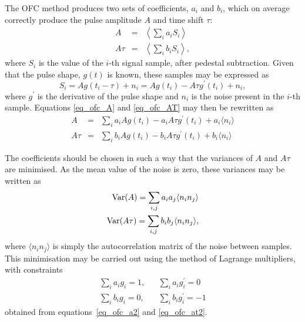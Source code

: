 The OFC method produces two sets of coefficients, $a_i$ and $b_i$, which on average correctly produce the pulse amplitude $A$ and time shift $\tau$:
\begin{eqnarray}
A & = & \left \langle \sum_i a_i S_i  \right \rangle \label{eq_ofc_A} \\
A \tau & = & \left \langle \sum_i b_i S_i \right \rangle , \label{eq_ofc_AT}
\end{eqnarray}
where $S_i$ is the value of the $i$-th signal sample, after pedestal subtraction. Given that the pulse shape, $g(t)$  is known, these samples may be expressed as
\begin{equation}
\label{eq_OFC_taylor}
 S_i = A g(t_i - \tau) + n_i = A g(t_i) - A \tau g^\prime(t_i) +n_i, 
\end{equation}
where $g^\prime$ is the derivative of the pulse shape and $n_i$ is the noise present in the $i$-th sample. Equations \ref{eq_ofc_A} and \ref{eq_ofc_AT} may then be rewritten as 
 \begin{eqnarray}
A & = &  \sum_i a_i A g(t_i) -  a_i A \tau g^\prime(t_i)  + a_i \langle n_i \rangle  \label{eq_ofc_a2}\\
A \tau & = &  \sum_i b_i A g(t_i) -  b_i A \tau g^\prime(t_i)  + b_i \langle n_i \rangle \label{eq_ofc_at2}
\end{eqnarray}

The coefficients should be chosen in such a way that the variances of $A$ and $A \tau$ are minimised. As the mean value of the noise is zero, these variances may be written as
\begin{eqnarray}
{\rm Var} (A) = \sum_{i,j} a_i a_j \langle n_i n_j\rangle \\
{\rm Var} (A \tau) = \sum_{i,j} b_i b_j \langle n_i n_j\rangle ,
\end{eqnarray}
where $\langle n_i n_j \rangle$ is simply the autocorrelation matrix of the noise between samples. This minimisation may be carried out using the method of Lagrange multipliers, with constraints 
%
%
\begin{displaymath}
\begin{array}{lll}
\sum_i a_i g_i = 1, & &\sum_i a_i g^\prime_i = 0\\
\sum_i b_i g_i = 0, & &\sum_i b_i g^\prime_i = -1
\end{array}
\end{displaymath}
obtained from equations~\ref{eq_ofc_a2} and \ref{eq_ofc_at2}.

